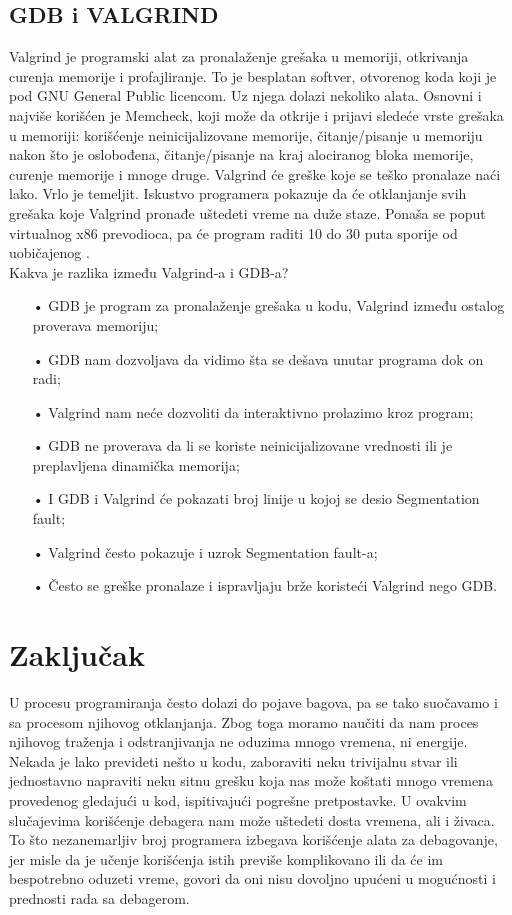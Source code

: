 \documentclass[a4paper]{article}
\begin{document}
\subsection{GDB i VALGRIND}
\label{subsec:valgrind}
Valgrind je programski alat za pronalaženje grešaka u memoriji, otkrivanja curenja memorije i 
profajliranje. To je besplatan softver, otvorenog koda koji je pod GNU General Public licencom. 
Uz njega dolazi nekoliko alata. Osnovni i najviše korišćen je Memcheck, koji može da otkrije i  
prijavi sledeće vrste grešaka u memoriji: korišćenje neinicijalizovane memorije, čitanje/pisanje u 
memoriju nakon što je oslobođena, čitanje/pisanje na kraj alociranog bloka memorije, 
curenje memorije i  mnoge druge. Valgrind će greške koje se teško pronalaze naći lako. Vrlo je 
temeljit. Iskustvo programera pokazuje da će otklanjanje svih grešaka koje Valgrind pronađe 
uštedeti vreme na duže staze. Ponaša se poput virtualnog x86 prevodioca, pa će program raditi 10 
do 30 puta sporije od uobičajenog \cite{hpc}.\\

Kakva je razlika između Valgrind-a i GDB-a?
\begin{enumerate}
\item[•]GDB je program za pronalaženje grešaka u kodu, Valgrind između ostalog proverava memoriju;
\item[•]GDB nam dozvoljava da vidimo šta se dešava unutar programa dok on radi;
\item[•]Valgrind nam neće dozvoliti da interaktivno prolazimo kroz program;
\item[•]GDB ne proverava da li se koriste neinicijalizovane vrednosti ili je preplavljena dinamička memorija;
\item[•]I GDB i Valgrind će pokazati broj linije u kojoj se desio Segmentation fault;
\item[•]Valgrind često pokazuje i uzrok  Segmentation fault-a;
\item[•]Često se greške pronalaze i ispravljaju brže koristeći Valgrind nego GDB. \cite{hpc}
\end{enumerate}

\section{Zaključak}
\label{sec:zakljucak}

U procesu programiranja često dolazi do pojave bagova, pa se tako suočavamo i sa procesom njihovog otklanjanja. Zbog toga moramo naučiti da nam proces njihovog traženja i odstranjivanja ne oduzima mnogo vremena, ni energije. Nekada je lako prevideti nešto u kodu, zaboraviti neku trivijalnu stvar ili jednostavno napraviti neku sitnu grešku koja nas može koštati mnogo vremena provedenog gledajući u kod, ispitivajući pogrešne pretpostavke. U ovakvim slučajevima korišćenje debagera nam može uštedeti dosta vremena, ali i živaca. To što nezanemarljiv broj programera izbegava korišćenje alata za debagovanje, jer misle da je učenje korišćenja istih previše komplikovano ili da će im bespotrebno oduzeti vreme, govori da oni nisu dovoljno upućeni u mogućnosti i prednosti rada sa debagerom.
\end{document}
